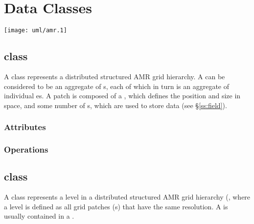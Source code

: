 \documentclass{book}
\begin{document}
\chapter{Data Classes} \label{s:data-classes}

\centerline{\texttt{[image: uml/amr.1]}}

\section{ class}

A  class represents a distributed structured AMR grid
hierarchy.  A  can be considered to be an aggregate of
s, each of which in turn is an aggregate of individual
es.  A patch is composed of a , which defines
the position and size in space, and some number of s, which
are used to store  data (see \S\ref{ss:field}).



\subsection{Attributes}

\subsection{Operations}

\section{ class}

A  class represents a level in a distributed structured
AMR grid hierarchy (, where a level is defined as all
grid patches (s) that have the same resolution.  A
 is usually contained in a .

\end{document}

